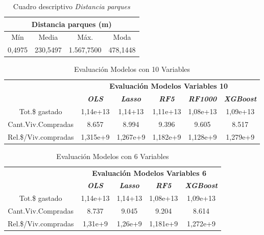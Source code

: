\documentclass[conference, 10pt]{IEEEtran}
\begin{document}
\begin{table}[htbp]
\caption{Cuadro descriptivo \textit{Distancia parques}}
\begin{center}
\begin{tabular}{|c|c|c|c|}
\hline
\multicolumn{4}{|c|}{\textbf{Distancia parques (m)}} \\
\cline{1-4} 
\hline
 Mín&Media&Máx.&Moda\\
\hline
 0,4975&230,5497&1.567,7500&478,1448\\
 	\hline
\end{tabular}
\label{tab_10}
\end{center}
\end{table}


\begin{table}[htbp]
\caption{Evaluación Modelos con 10 Variables}
\begin{center}
\begin{tabular}{|c|c|c|c|c|c|}
\hline
&\multicolumn{5}{|c|}{\textbf{Evaluación Modelos Variables 10}} \\
\cline{2-6} 
& \textbf{\textit{OLS}}& \textbf{\textit{Lasso}}& \textbf{\textit{RF5}}& \textbf{\textit{RF1000}}& \textbf{\textit{XGBoost}} \\
\hline
Tot.\$ gastado& 1,14e+13& 1,14+13& 1,11e+13& 1,08e+13& 1,09e+13 \\
\hline
Cant.Viv.Compradas& 8.657& 8.994& 9.396& 9.605& 8.517 \\
\hline
Rel.\$/Viv.compradas& 1,315e+9& 1,267e+9& 1,182e+9& 1,128e+9& 1,279e+9 \\

\hline
\end{tabular}
\label{tab_11}
\end{center}
\end{table}

\begin{table}[htbp]
\caption{Evaluación Modelos con 6 Variables}
\begin{center}
\begin{tabular}{|c|c|c|c|c|}
\hline
&\multicolumn{4}{|c|}{\textbf{Evaluación Modelos Variables 6}} \\
\cline{2-5} 
& \textbf{\textit{OLS}}& \textbf{\textit{Lasso}}& \textbf{\textit{RF5}}& \textbf{\textit{XGBoost}} \\
\hline
Tot.\$ gastado& 1,14e+13& 1,14+13& 1,08e+13& 1,09e+13 \\
\hline
Cant.Viv.Compradas& 8.737& 9.045& 9.204& 8.614 \\
\hline
Rel.\$/Viv.compradas& 1,31e+9& 1,26e+9& 1,181e+9& 1,272e+9 \\

\hline
\end{tabular}
\label{tab_12}
\end{center}
\end{table}
\end{document}
